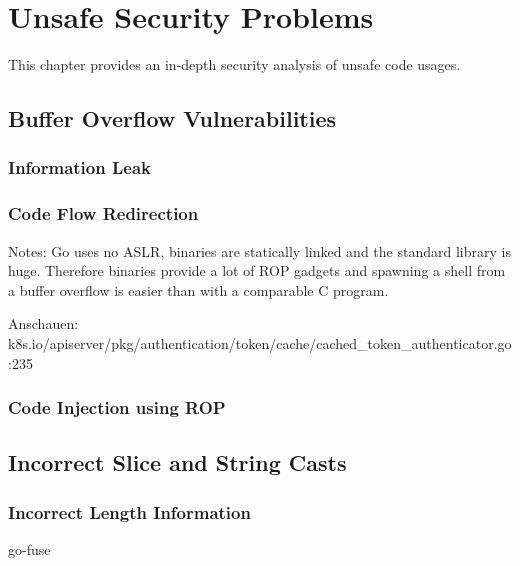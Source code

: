 \chapter{Unsafe Security Problems}\label{ch:unsafe-security-problems}

This chapter provides an in-depth security analysis of unsafe code usages.




\section{Buffer Overflow Vulnerabilities}

\subsection{Information Leak}

\subsection{Code Flow Redirection}

Notes: Go uses no \acrshort{ASLR}, binaries are statically linked and the standard library is huge.
Therefore binaries provide a lot of ROP gadgets and spawning a shell from a buffer overflow is easier than with a
comparable C program.

Anschauen: k8s.io/apiserver/pkg/authentication/token/cache/cached\_token\_authenticator.go:235




\subsection{Code Injection using ROP}





\section{Incorrect Slice and String Casts}

\subsection{Incorrect Length Information}

go-fuse

